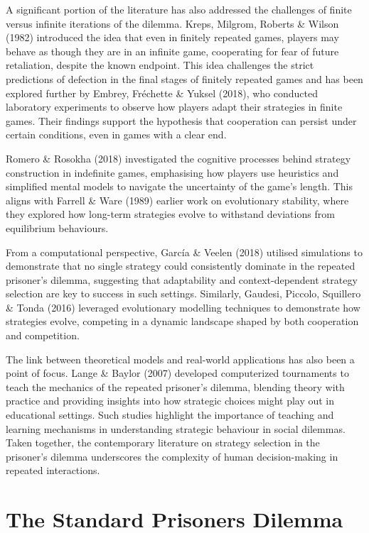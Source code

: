 \documentclass[11pt,preprint]{elsarticle}
\numberwithin{equation}{section}
\numberwithin{figure}{section}
\numberwithin{table}{section}
\begin{document}
A significant portion of the literature has also addressed the
challenges of finite versus infinite iterations of the dilemma. Kreps,
Milgrom, Roberts \& Wilson (1982) introduced the idea that even in
finitely repeated games, players may behave as though they are in an
infinite game, cooperating for fear of future retaliation, despite the
known endpoint. This idea challenges the strict predictions of defection
in the final stages of finitely repeated games and has been explored
further by Embrey, Fréchette \& Yuksel (2018), who conducted laboratory
experiments to observe how players adapt their strategies in finite
games. Their findings support the hypothesis that cooperation can
persist under certain conditions, even in games with a clear end.

Romero \& Rosokha (2018) investigated the cognitive processes behind
strategy construction in indefinite games, emphasising how players use
heuristics and simplified mental models to navigate the uncertainty of
the game's length. This aligns with Farrell \& Ware (1989) earlier work
on evolutionary stability, where they explored how long-term strategies
evolve to withstand deviations from equilibrium behaviours.

From a computational perspective, García \& Veelen (2018) utilised
simulations to demonstrate that no single strategy could consistently
dominate in the repeated prisoner's dilemma, suggesting that
adaptability and context-dependent strategy selection are key to success
in such settings. Similarly, Gaudesi, Piccolo, Squillero \& Tonda (2016)
leveraged evolutionary modelling techniques to demonstrate how
strategies evolve, competing in a dynamic landscape shaped by both
cooperation and competition.

The link between theoretical models and real-world applications has also
been a point of focus. Lange \& Baylor (2007) developed computerized
tournaments to teach the mechanics of the repeated prisoner's dilemma,
blending theory with practice and providing insights into how strategic
choices might play out in educational settings. Such studies highlight
the importance of teaching and learning mechanisms in understanding
strategic behaviour in social dilemmas. Taken together, the contemporary
literature on strategy selection in the prisoner's dilemma underscores
the complexity of human decision-making in repeated interactions.

\section{The Standard Prisoners
Dilemma}\label{the-standard-prisoners-dilemma}
\end{document}
